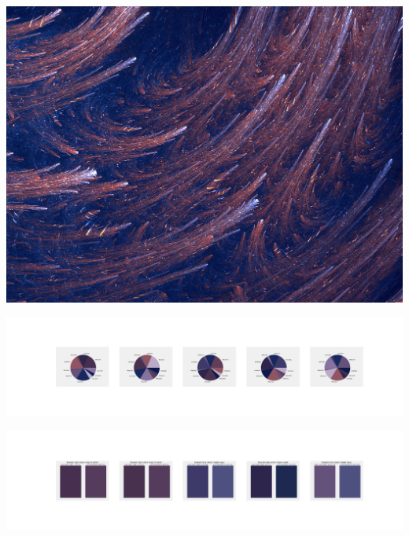 \documentclass[11pt]{article}
\begin{document}
\begin{landscape}
    \begin{center}
    \includegraphics[width=\textwidth]{./nbimg/file (199).jpg}
    \end{center}

    \begin{center}
    \includegraphics[width=250mm]{./nbimg/pie-110.jpg}
    \end{center}

    \begin{center}
    \includegraphics[width=250mm]{./nbimg/peak-110.jpg}
    \end{center}
    


\end{landscape}
\end{document}
